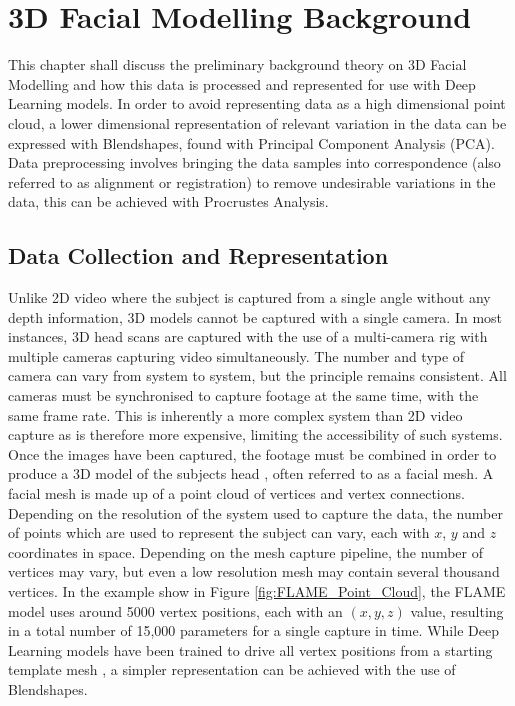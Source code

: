 \documentclass[12pt]{report}
\begin{document}
\chapter{3D Facial Modelling Background}

This chapter shall discuss the preliminary background theory on 3D Facial Modelling and how this data is processed and represented for use with Deep Learning models.
In order to avoid representing data as a high dimensional point cloud, a lower dimensional representation of relevant variation in the data can be expressed with Blendshapes, found with Principal Component Analysis (PCA).
Data preprocessing involves bringing the data samples into correspondence (also referred to as alignment or registration) to remove undesirable variations in the data, this can be achieved with Procrustes Analysis.

\section{Data Collection and Representation}
Unlike 2D video where the subject is captured from a single angle without any depth information, 3D models cannot be captured with a single camera.
In most instances, 3D head scans are captured with the use of a multi-camera rig with multiple cameras capturing video simultaneously.
The number and type of camera can vary from system to system, but the principle remains consistent.
All cameras must be synchronised to capture footage at the same time, with the same frame rate.
This is inherently a more complex system than 2D video capture as is therefore more expensive, limiting the accessibility of such systems.  
Once the images have been captured, the footage must be combined in order to produce a 3D model of the subjects head \cite{Li2017}, often referred to as a facial mesh.
A facial mesh is made up of a point cloud of vertices and vertex connections.
Depending on the resolution of the system used to capture the data, the number of points which are used to represent the subject can vary, each with $x$, $y$ and $z$ coordinates in space.
Depending on the mesh capture pipeline, the number of vertices may vary, but even a low resolution mesh may contain several thousand vertices.
In the example show in Figure \ref{fig:FLAME_Point_Cloud}, the FLAME model \cite{Li2017} uses around 5000 vertex positions, each with an $(x, y, z)$ value, resulting in a total number of 15,000 parameters for a single capture in time.
While Deep Learning models have been trained to drive all vertex positions from a starting template mesh \cite{Karras2017a}, a simpler representation can be achieved with the use of Blendshapes.
\end{document}
